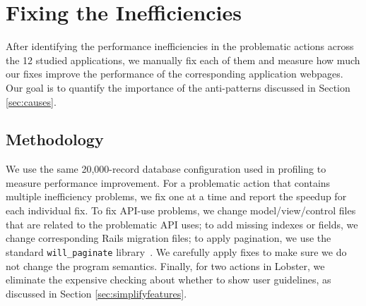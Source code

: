 

\section{Fixing the Inefficiencies}
\label{sec:opt}

After identifying the performance inefficiencies in the \numpactions problematic actions across the 12 studied applications, we manually fix each of them and measure how much our fixes improve the performance of the corresponding application webpages. Our goal is to quantify the importance of the anti-patterns discussed in Section \ref{sec:causes}. 

\subsection{Methodology}
We use the same 20,000-record database configuration used in profiling to measure performance improvement.
For a problematic action that contains multiple inefficiency problems, we fix one at a time and report the speedup for each individual fix.
To fix API-use problems, we change model/view/control files that are related to the problematic API uses; to add missing indexes or fields, we change corresponding Rails migration files; to apply pagination, we use the standard \texttt{will\_paginate} library~\cite{gem:paginate}. We carefully apply  fixes to make sure we do not change the program semantics.
Finally, for two actions in Lobster, we eliminate the expensive checking about whether to show user guidelines, as discussed in Section \ref{sec:simplifyfeatures}.
